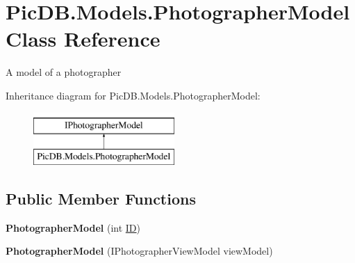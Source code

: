 \hypertarget{class_pic_d_b_1_1_models_1_1_photographer_model}{}\section{Pic\+D\+B.\+Models.\+Photographer\+Model Class Reference}
\label{class_pic_d_b_1_1_models_1_1_photographer_model}


A model of a photographer  


Inheritance diagram for Pic\+D\+B.\+Models.\+Photographer\+Model\+:\begin{figure}[H]
\begin{center}
\leavevmode
\includegraphics[height=2.000000cm]{class_pic_d_b_1_1_models_1_1_photographer_model}
\end{center}
\end{figure}
\subsection*{Public Member Functions}
\begin{DoxyCompactItemize}
\item 
\mbox{\label{class_pic_d_b_1_1_models_1_1_photographer_model_aa73915fbcee8f117086869f5a3729a7f}} 
{\bfseries Photographer\+Model} (int \mbox{\hyperlink{class_pic_d_b_1_1_models_1_1_photographer_model_ab007cd91a9972d0174b0c779583c6a13}{ID}})
\item 
\mbox{\label{class_pic_d_b_1_1_models_1_1_photographer_model_ae8ff0bab5721e4107a693cc1e9a2d55c}} 
{\bfseries Photographer\+Model} (I\+Photographer\+View\+Model view\+Model)
\end{DoxyCompactItemize}
